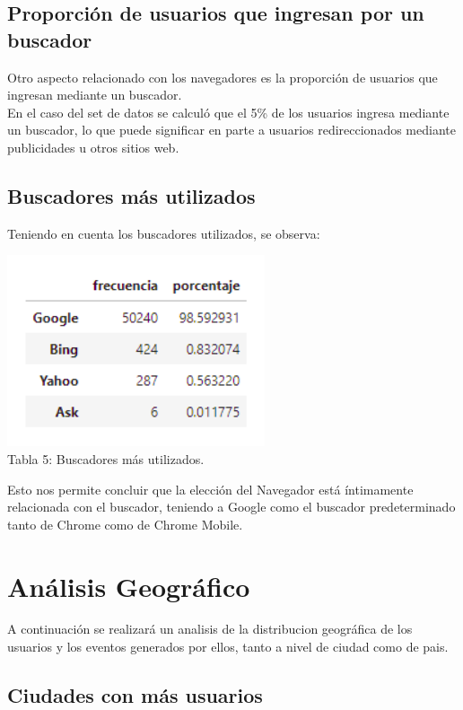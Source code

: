 \documentclass[a4paper ,12pt]{article}
\begin{document}
\newpage
\subsection{Proporción de usuarios que ingresan por un buscador }
Otro aspecto relacionado con los navegadores es la proporción de usuarios que ingresan mediante un buscador.\\


En el caso del set de datos se calculó que el 5\% de los usuarios ingresa mediante un buscador, lo que puede significar en parte a usuarios redireccionados mediante publicidades u otros sitios web.

\subsection{Buscadores más utilizados}


Teniendo en cuenta los buscadores utilizados, se observa:

\begin{center}
	\includegraphics[width=0.5\linewidth]{table_5}
	\\Tabla 5: Buscadores más utilizados.
	
\end{center}


Esto nos permite concluir que la elección del Navegador está íntimamente relacionada con el buscador, teniendo a Google como el buscador predeterminado tanto de Chrome como de Chrome Mobile.

\newpage

\section{Análisis Geográfico}


A continuación se realizará un analisis de la distribucion geográfica de los usuarios y los eventos generados por ellos, tanto a nivel de ciudad como de pais. 

\subsection{Ciudades con más usuarios}
\end{document}
